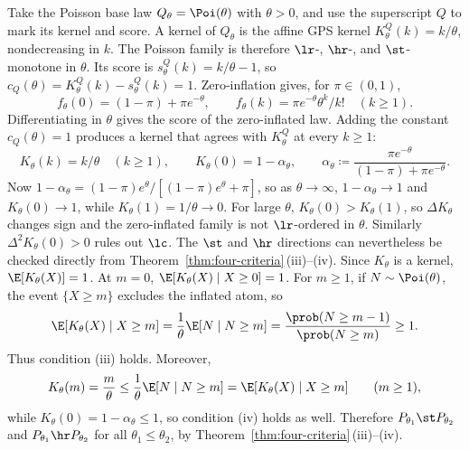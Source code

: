 \documentclass[11pt]{article}
\begin{document}
\begin{example}
\label{ex:zero-inflated}
Take the Poisson base law $Q_\theta=\Poi(\theta)$ with $\theta>0$, and use the superscript $Q$ to mark its kernel and score. A kernel of $Q_\theta$ is the affine GPS kernel $K_\theta^Q(k)=k/\theta$, nondecreasing in $k$. The Poisson family is therefore $\lr$-, $\hr$-, and $\st$-monotone in $\theta$. Its score is \(s_\theta^Q(k)=k/\theta-1\), so \(c_Q(\theta)=K_\theta^Q(k)-s_\theta^Q(k)=1\). Zero-inflation gives, for $\pi\in(0,1)$,
\[
f_\theta(0)=(1-\pi)+\pi e^{-\theta},
\qquad
f_\theta(k)=\pi e^{-\theta}\theta^k/k!\quad (k\ge 1).
\]
Differentiating in $\theta$ gives the score of the zero-inflated law. Adding the constant $c_Q(\theta)=1$ produces a kernel that agrees with $K_\theta^Q$ at every $k\ge 1$:
\[
K_\theta(k)=k/\theta\quad (k\ge 1),
\qquad
K_\theta(0)=1-\alpha_\theta,
\qquad
\alpha_\theta\coloneqq \frac{\pi e^{-\theta}}{(1-\pi)+\pi e^{-\theta}}.
\]
Now $1-\alpha_\theta=(1-\pi)e^{\theta}/[(1-\pi)e^{\theta}+\pi]$, so as $\theta\to\infty$, \(1-\alpha_\theta\to 1\) and $K_\theta(0)\to 1$, while $K_\theta(1)=1/\theta\to 0$. For large $\theta$, $K_\theta(0)>K_\theta(1)$, so $\Delta K_\theta$ changes sign and the zero-inflated family is not $\lr$-ordered in $\theta$. Similarly $\Delta^2 K_\theta(0)>0$ rules out $\lc$. The \(\st\) and \(\hr\) directions can nevertheless be checked directly from Theorem~\ref{thm:four-criteria}\,\textup{(iii)}--(iv). Since \(K_\theta\) is a kernel, \(\E[K_\theta(X)]=1\). At \(m=0\), \(\E[K_\theta(X)\mid X\ge 0]=1\). For \(m\ge 1\), if \(N\sim\Poi(\theta)\), the event \(\{X\ge m\}\) excludes the inflated atom, so
\[
\E[K_\theta(X)\mid X\ge m]
=\frac{1}{\theta}\E[N\mid N\ge m]
=\frac{\prob(N\ge m-1)}{\prob(N\ge m)}
\ge 1.
\]
Thus condition \textup{(iii)} holds. Moreover,
\[
K_\theta(m)=\frac{m}{\theta}
\le \frac{1}{\theta}\E[N\mid N\ge m]
=\E[K_\theta(X)\mid X\ge m]
\qquad (m\ge 1),
\]
while \(K_\theta(0)=1-\alpha_\theta\le 1\), so condition \textup{(iv)} holds as well. Therefore \(P_{\theta_1}\st P_{\theta_2}\) and \(P_{\theta_1}\hr P_{\theta_2}\) for all \(\theta_1\le\theta_2\), by Theorem~\ref{thm:four-criteria}\,\textup{(iii)}--\textup{(iv)}.
\end{example}
\end{document}
